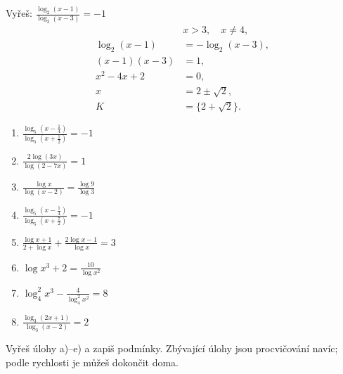 \documentclass[11pt,a4paper]{article}
\begin{document}
\begin{prikladReseniBox}[title={Příklad 4}]
Vyřeš: $\displaystyle \frac{\log_2(x-1)}{\log_2(x-3)}=-1$
\tcblower
\[
\begin{aligned}
&x>3,\quad x\ne4,\\
\log_2(x-1)&=-\log_2(x-3),\\
(x-1)(x-3)&=1,\\
x^2-4x+2&=0,\\
x&=2\pm\sqrt2,\\
K&=\{2+\sqrt2\}.
\end{aligned}
\]
\end{prikladReseniBox}
\begin{zadaniBox}[title={Samostatná práce 1}]
\begin{enumerate}[label=\alph*)]
\item $\displaystyle \frac{\log_5(x-\frac14)}{\log_5(x+\frac12)}=-1$
\item $\displaystyle \frac{2\log(3x)}{\log(2-7x)}=1$
\item $\displaystyle \frac{\log x}{\log(x-2)}=\frac{\log9}{\log3}$
\item $\displaystyle \frac{\log_5(x-\frac14)}{\log_5(x+\frac72)}=-1$
\item $\displaystyle \frac{\log x+1}{2+\log x}+\frac{2\log x-1}{\log x}=3$
\item $\displaystyle \log x^3+2=\frac{10}{\log x^2}$
\item $\displaystyle \log_4^2 x^3-\frac{4}{\log_4^2 x^2}=8$
\item $\displaystyle \frac{\log_3(2x+1)}{\log_3(x-2)}=2$
\end{enumerate}
\end{zadaniBox}
Vyřeš úlohy a)--e) a zapiš podmínky. Zbývající úlohy jsou procvičování navíc; podle rychlosti je můžeš dokončit doma. 
\end{document}
